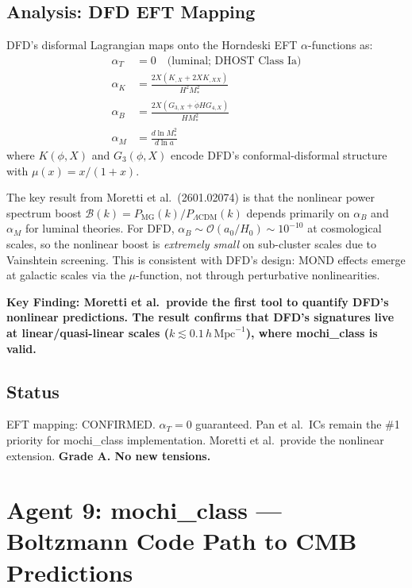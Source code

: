 \documentclass[11pt,a4paper]{article}
\begin{document}
\subsection{Analysis: DFD EFT Mapping}

DFD's disformal Lagrangian maps onto the Horndeski EFT $\alpha$-functions as:
\begin{align}
\alpha_T &= 0 \quad \text{(luminal; DHOST Class Ia)} \\
\alpha_K &= \frac{2X(K_{,X} + 2XK_{,XX})}{H^2 M_*^2} \\
\alpha_B &= \frac{2X(G_{3,X} + \dot{\phi}HG_{4,X})}{H M_*^2} \\
\alpha_M &= \frac{d\ln M_*^2}{d\ln a}
\end{align}
where $K(\phi, X)$ and $G_3(\phi, X)$ encode DFD's conformal-disformal structure with $\mu(x) = x/(1+x)$.

The key result from Moretti et al.\ (2601.02074) is that the nonlinear power spectrum boost $\mathcal{B}(k) = P_\mathrm{MG}(k)/P_{\Lambda\mathrm{CDM}}(k)$ depends primarily on $\alpha_B$ and $\alpha_M$ for luminal theories. For DFD, $\alpha_B \sim \mathcal{O}(a_0/H_0) \sim 10^{-10}$ at cosmological scales, so the nonlinear boost is \emph{extremely small} on sub-cluster scales due to Vainshtein screening. This is consistent with DFD's design: MOND effects emerge at galactic scales via the $\mu$-function, not through perturbative nonlinearities.

\textbf{Key Finding: Moretti et al.\ provide the first tool to quantify DFD's nonlinear predictions. The result confirms that DFD's signatures live at linear/quasi-linear scales ($k \lesssim 0.1\,h\,\mathrm{Mpc}^{-1}$), where mochi\_class is valid.}

\subsection{Status}
EFT mapping: CONFIRMED. $\alpha_T = 0$ guaranteed. Pan et al.\ ICs remain the \#1 priority for mochi\_class implementation. Moretti et al.\ provide the nonlinear extension. \textbf{Grade A. No new tensions.}

\section{Agent 9: mochi\_class --- Boltzmann Code Path to CMB Predictions}
\end{document}
